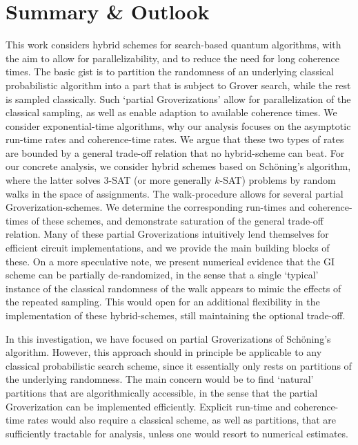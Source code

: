 \documentclass[a4paper,aps,floatfix]{revtex4}
\begin{document}
\section{Summary \& Outlook}


This work considers hybrid schemes for search-based quantum algorithms, with the aim to allow for parallelizability, and to reduce the need for long coherence times. The basic gist is to partition the randomness of an underlying classical probabilistic algorithm into a part that is subject to Grover search, while the rest is sampled classically. Such `partial Groverizations' allow for parallelization of the classical sampling, as well as enable adaption to available coherence times. We consider exponential-time algorithms, why our analysis focuses on the asymptotic run-time rates and coherence-time rates. We argue that these two types of rates are bounded by a general trade-off relation that no hybrid-scheme can beat. For our concrete analysis, we consider hybrid schemes based on  Sch\"oning's algorithm, where the latter solves $3$-SAT (or more generally $k$-SAT) problems by random walks in the space of assignments. The walk-procedure allows for several partial Groverization-schemes.  We determine the corresponding run-times and coherence-times of these schemes, and demonstrate saturation of the general trade-off relation.  Many of these partial Groverizations intuitively lend themselves for efficient circuit implementations, and we provide the main building blocks of these. On a more speculative note, we present numerical evidence that the GI scheme can be partially de-randomized, in the sense that a single `typical' instance of the classical randomness of the walk appears to mimic the effects of the repeated sampling. This would open for an additional flexibility in the implementation of these hybrid-schemes, still maintaining the optional trade-off.


In this investigation, we have focused on partial Groverizations of  Sch\"oning's algorithm. However, this approach should in principle be applicable to any classical probabilistic search scheme, since it essentially only rests on partitions of the underlying randomness. The main concern would be to find `natural' partitions that are algorithmically accessible, in the sense that the partial Groverization can be implemented efficiently.  Explicit run-time and coherence-time rates would also require a classical scheme, as well as partitions, that are sufficiently tractable for analysis, unless one would resort to numerical estimates.
\end{document}
